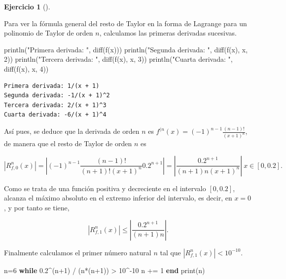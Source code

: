\documentclass[
  a4paper,
]{scrreport}
\newenvironment{Shaded}{\begin{snugshade}}{\end{snugshade}}
\newcommand{\ControlFlowTok}[1]{\textcolor[rgb]{0.00,0.23,0.31}{\textbf{#1}}}
\newcommand{\FloatTok}[1]{\textcolor[rgb]{0.68,0.00,0.00}{#1}}
\newcommand{\FunctionTok}[1]{\textcolor[rgb]{0.28,0.35,0.67}{#1}}
\newcommand{\NormalTok}[1]{\textcolor[rgb]{0.00,0.23,0.31}{#1}}
\newcommand{\OperatorTok}[1]{\textcolor[rgb]{0.37,0.37,0.37}{#1}}
\newcommand{\StringTok}[1]{\textcolor[rgb]{0.13,0.47,0.30}{#1}}
\theoremstyle{definition}
\newtheorem{exercise}{Ejercicio}[chapter]
\theoremstyle{remark}
\begin{document}
\begin{exercise}[]
\begin{tcolorbox}
Para ver la fórmula general del resto de Taylor en la forma de Lagrange
para un polinomio de Taylor de orden \(n\), calculamos las primeras
derivadas sucesivas.

\begin{Shaded}
\begin{Highlighting}[]
\FunctionTok{println}\NormalTok{(}\StringTok{"Primera derivada: "}\NormalTok{, }\FunctionTok{diff}\NormalTok{(}\FunctionTok{f}\NormalTok{(x)))}
\FunctionTok{println}\NormalTok{(}\StringTok{"Segunda derivada: "}\NormalTok{, }\FunctionTok{diff}\NormalTok{(}\FunctionTok{f}\NormalTok{(x), x, }\FloatTok{2}\NormalTok{))}
\FunctionTok{println}\NormalTok{(}\StringTok{"Tercera derivada: "}\NormalTok{, }\FunctionTok{diff}\NormalTok{(}\FunctionTok{f}\NormalTok{(x), x, }\FloatTok{3}\NormalTok{))}
\FunctionTok{println}\NormalTok{(}\StringTok{"Cuarta derivada: "}\NormalTok{, }\FunctionTok{diff}\NormalTok{(}\FunctionTok{f}\NormalTok{(x), x, }\FloatTok{4}\NormalTok{))}
\end{Highlighting}
\end{Shaded}

\begin{verbatim}
Primera derivada: 1/(x + 1)
Segunda derivada: -1/(x + 1)^2
Tercera derivada: 2/(x + 1)^3
Cuarta derivada: -6/(x + 1)^4
\end{verbatim}

Así pues, se deduce que la derivada de orden \(n\) es
\(f^{(n}(x)=(-1)^{n-1}\frac{(n-1)!}{(x+1)^n}\), de manera que el resto
de Taylor de orden \(n\) es

\[
|R^n_{f,0}(x)| = \left|(-1)^{n-1}\frac{(n-1)!}{(n+1)!(x+1)^n}0.2^{n+1}\right| = \left|\frac{0.2^{n+1}}{(n+1)n(x+1)^n}\right|\ x\in [0,0.2].
\]

Como se trata de una función positiva y decreciente en el intervalo
\([0,0.2]\), alcanza el máximo absoluto en el extremo inferior del
intervalo, es decir, en \(x=0\), y por tanto se tiene,

\[
|R^n_{f,1}(x)| \leq \left|\frac{0.2^{n+1}}{(n+1)n}\right|.
\]

Finalmente calculamos el primer número natural \(n\) tal que
\(|R^n_{f,1}(x)|<10^{-10}\).

\begin{Shaded}
\begin{Highlighting}[]
\NormalTok{n}\OperatorTok{=}\FloatTok{6}
\ControlFlowTok{while} \FloatTok{0.2}\OperatorTok{\^{}}\NormalTok{(n}\OperatorTok{+}\FloatTok{1}\NormalTok{) }\OperatorTok{/}\NormalTok{ (}\FunctionTok{n*}\NormalTok{(n}\OperatorTok{+}\FloatTok{1}\NormalTok{)) }\OperatorTok{\textgreater{}} \FloatTok{10}\OperatorTok{\^{}{-}}\FloatTok{10}
\NormalTok{    n }\OperatorTok{+=} \FloatTok{1}
\ControlFlowTok{end}
\FunctionTok{print}\NormalTok{(n)}
\end{Highlighting}
\end{Shaded}


\end{tcolorbox}
\end{exercise}
\end{document}
